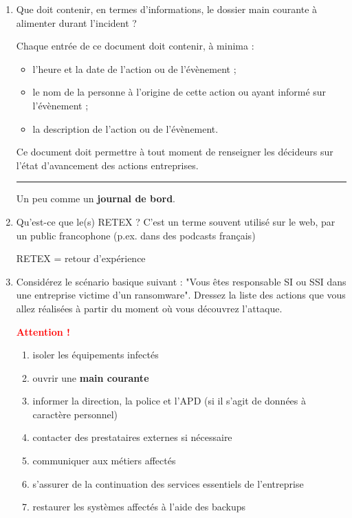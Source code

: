 \documentclass[a4paper]{article}
\begin{document}
\begin{enumerate}
\item Que doit contenir, en termes d'informations, le dossier main courante à alimenter durant l'incident ?
\begin{example}
    Chaque entrée de ce document doit contenir, à minima :
    \begin{itemize}
        \item l’heure et la date de l’action ou de l’évènement ;
        \item le nom de la personne à l’origine de cette action ou ayant
        informé sur l’évènement ;
        \item la description de l’action ou de l’évènement.
    \end{itemize}
    Ce document doit permettre à tout moment de renseigner les décideurs sur l’état d’avancement des actions entreprises.

    \begin{center} \rule{0.99\linewidth}{0.1mm} \end{center}

    Un peu comme un \textbf{journal de bord}.
\end{example}



\item Qu'est-ce que le(s) RETEX ? C'est un terme souvent utilisé sur le web, par un public francophone (p.ex. dans des podcasts français)
\begin{example}
    RETEX = retour d'expérience
\end{example}



\item Considérez le scénario basique suivant : "Vous êtes responsable SI ou SSI dans une entreprise victime d'un ransomware". Dressez la liste des actions que vous allez réalisées à partir du moment où vous découvrez l'attaque.
\begin{example}
    \textcolor{red}{\textbf{Attention !}}
    \begin{enumerate}
        \item isoler les équipements infectés
        \item ouvrir une \textbf{main courante}
        \item informer la direction, la police et l'APD (si il s'agit de données à caractère personnel)
        \item contacter des prestataires externes si nécessaire
        \item communiquer aux métiers affectés
        \item s'assurer de la continuation des services essentiels de l'entreprise
        \item restaurer les systèmes affectés à l'aide des backups
    \end{enumerate}
\end{example}




\end{enumerate}
\end{document}
